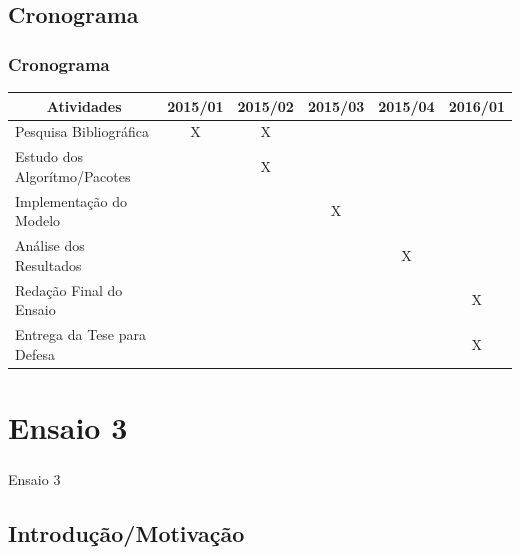\documentclass[aspectratio=169]{beamer}
\begin{document}
\subsection{Cronograma}

\begin{frame}\frametitle{Cronograma}
\begin{table}[h]
\begin{tabular}{llllll}
\hline
\multicolumn{1}{c}{\textbf{Atividades}} & 2015/01               & 2015/02               & 2015/03               & 2015/04               & 2016/01               \\ \hline
Pesquisa Bibliográfica                  & \multicolumn{1}{c}{X} & \multicolumn{1}{c}{X} &                       &                       &                       \\
Estudo dos Algorítmo/Pacotes            &                       & \multicolumn{1}{c}{X} &                       &                       &                       \\
Implementação do Modelo                 &                       &                       & \multicolumn{1}{c}{X} &                       &                       \\
Análise dos Resultados                  &                       &                       &                       & \multicolumn{1}{c}{X} &                       \\
Redação Final do Ensaio                  &                       &                       &                       &                       & \multicolumn{1}{c}{X} \\
Entrega da Tese para Defesa             &                       &                       &                       &                       & \multicolumn{1}{c}{X} \\ \hline
\end{tabular}
\end{table}
\end{frame}

\section{Ensaio 3}
  
\begin{frame}\frametitle{}
  \begin{center}
  {\Huge Ensaio 3}
	\end{center}
\end{frame}

\subsection{Introdução/Motivação}
\end{document}
